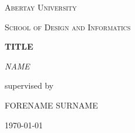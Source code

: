 \documentclass[dissertation.tex]{subfiles}
\begin{document}
	\begin{titlepage}
		\centering
		{\scshape\LARGE Abertay University \par}
		\vspace{1cm}
		{\scshape School of Design and Informatics \par}
		\vspace{1.5cm}
		{\Large\bfseries TITLE \par}
		\vspace{4cm}
		{\Large\itshape NAME \par}
		\vfill
		supervised by\par
		FORENAME \textsc{SURNAME}
		\vfill
		{\large \today\par}
	\end{titlepage}
\end{document}
